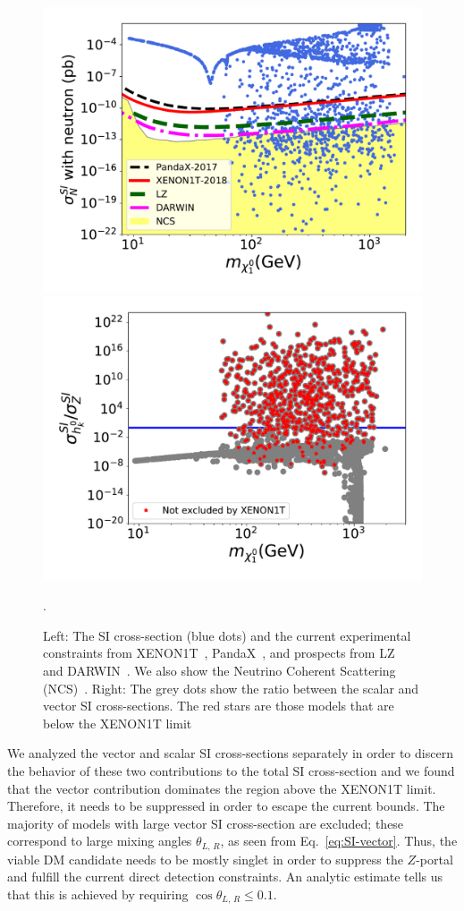 \documentclass[12pt,letterpaper]{article}
\begin{document}
\begin{figure}[h]
\centering
\includegraphics[scale=0.43]{SI}
\includegraphics[scale=0.43]{SI-ratio}
\caption{Left: The SI cross-section (blue dots) and the current experimental constraints from XENON1T~\cite{Aprile:2018dbl}, PandaX~\cite{Cui:2017nnn}, and prospects from LZ~\cite{Akerib:2018lyp} and DARWIN~\cite{Aalbers:2016jon}. 
We also show the Neutrino Coherent Scattering (NCS)~\cite{Cushman:2013zza, Billard:2013qya}. Right: The grey dots show the ratio between the scalar and vector SI cross-sections. The red stars are those models that are below the XENON1T limit}.
\label{fig:SI}
\end{figure}
We analyzed the vector and scalar SI cross-sections separately in order to discern the behavior of these two contributions to the total SI cross-section and we found that the vector contribution dominates the region above the XENON1T limit. Therefore, it needs to be suppressed in order to escape the current bounds. The majority of models with large vector SI cross-section are excluded; these correspond to large mixing angles $\theta_{L,\,R}$, as seen from Eq.~\eqref{eq:SI-vector}. Thus, the viable DM candidate needs to be mostly singlet in order to suppress the $Z$-portal and fulfill the current direct detection constraints. An analytic estimate tells us that this is achieved by requiring $\cos\theta_{L,\,R} \leqslant 0.1$.
\end{document}
